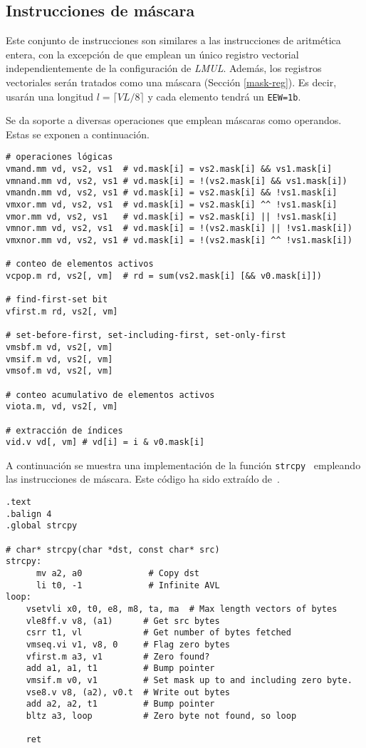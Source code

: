 \subsection{Instrucciones de máscara}{\label{sec:mask-operations}}
Este conjunto de instrucciones son similares a las instrucciones de aritmética
entera, con la excepción de que emplean un único registro vectorial
independientemente de la configuración de \textit{LMUL}. Además, los registros
vectoriales serán tratados como una máscara (Sección \ref{mask-reg}). Es decir,
usarán una longitud $l = \lceil VL/8 \rceil$ y cada elemento tendrá un
\texttt{EEW=1b}. 

Se da soporte a diversas operaciones que emplean máscaras como operandos. Estas se exponen a continuación. 

\begin{lstlisting}
# operaciones lógicas
vmand.mm vd, vs2, vs1  # vd.mask[i] = vs2.mask[i] && vs1.mask[i] 
vmnand.mm vd, vs2, vs1 # vd.mask[i] = !(vs2.mask[i] && vs1.mask[i])
vmandn.mm vd, vs2, vs1 # vd.mask[i] = vs2.mask[i] && !vs1.mask[i]
vmxor.mm vd, vs2, vs1  # vd.mask[i] = vs2.mask[i] ^^ !vs1.mask[i]
vmor.mm vd, vs2, vs1   # vd.mask[i] = vs2.mask[i] || !vs1.mask[i]
vmnor.mm vd, vs2, vs1  # vd.mask[i] = !(vs2.mask[i] || !vs1.mask[i])
vmxnor.mm vd, vs2, vs1 # vd.mask[i] = !(vs2.mask[i] ^^ !vs1.mask[i])

# conteo de elementos activos
vcpop.m rd, vs2[, vm]  # rd = sum(vs2.mask[i] [&& v0.mask[i]])

# find-first-set bit 
vfirst.m rd, vs2[, vm]

# set-before-first, set-including-first, set-only-first
vmsbf.m vd, vs2[, vm]
vmsif.m vd, vs2[, vm]
vmsof.m vd, vs2[, vm]

# conteo acumulativo de elementos activos
viota.m, vd, vs2[, vm]

# extracción de índices
vid.v vd[, vm] # vd[i] = i & v0.mask[i]
\end{lstlisting}

A continuación se muestra una implementación de la función \texttt{strcpy}~\cite{strcpy} empleando las instrucciones de máscara. Este código ha sido extraído de~\cite{riscv-isa2024}.

\begin{lstlisting}
.text
.balign 4
.global strcpy

# char* strcpy(char *dst, const char* src)
strcpy:
      mv a2, a0             # Copy dst
      li t0, -1             # Infinite AVL
loop:
    vsetvli x0, t0, e8, m8, ta, ma  # Max length vectors of bytes
    vle8ff.v v8, (a1)      # Get src bytes
    csrr t1, vl            # Get number of bytes fetched
    vmseq.vi v1, v8, 0     # Flag zero bytes
    vfirst.m a3, v1        # Zero found?
    add a1, a1, t1         # Bump pointer
    vmsif.m v0, v1         # Set mask up to and including zero byte.
    vse8.v v8, (a2), v0.t  # Write out bytes
    add a2, a2, t1         # Bump pointer
    bltz a3, loop          # Zero byte not found, so loop

    ret
\end{lstlisting}


